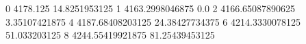 0 4178.125 14.8251953125
1 4163.2998046875 0.0
2 4166.65087890625 3.35107421875
4 4187.68408203125 24.38427734375
6 4214.3330078125 51.033203125
8 4244.55419921875 81.25439453125
